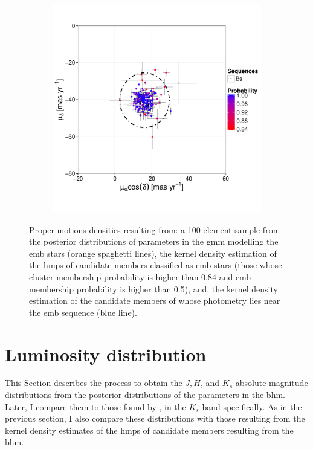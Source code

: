 \begin{figure}[ht!]
\begin{subfigure}[t]{0.45\textwidth}
     \includegraphics[page=3,width=\textwidth]{background/Figures/BHM/Bs_members.pdf}
        \caption{}
    \end{subfigure}
\caption{Proper motions densities resulting from: a 100 element sample from the posterior distributions of parameters in the \gls{gmm} modelling the \gls{emb} stars (orange spaghetti lines), the kernel density estimation of the \gls{hmps} of candidate members classified as \gls{emb} stars (those whose cluster membership probability is higher than 0.84 and \gls{emb} membership probability is higher than 0.5), and, the kernel density estimation of the candidate members of \citet{Bouy2015} whose photometry lies near the \gls{emb} sequence (blue line).}
\label{fig:PMBs}
\end{figure}

\section{Luminosity distribution}
\label{sect:luminosity}
This Section describes the process to obtain the $J,H$, and $K_s$ absolute magnitude distributions from the posterior distributions of the parameters in the \gls{bhm}. Later, I compare them to those found by \citet{Bouy2015}, in the $K_s$ band specifically. As in the previous section, I also compare these distributions with those resulting from the kernel density estimates of the \gls{hmps} of candidate members resulting from the \gls{bhm}.

